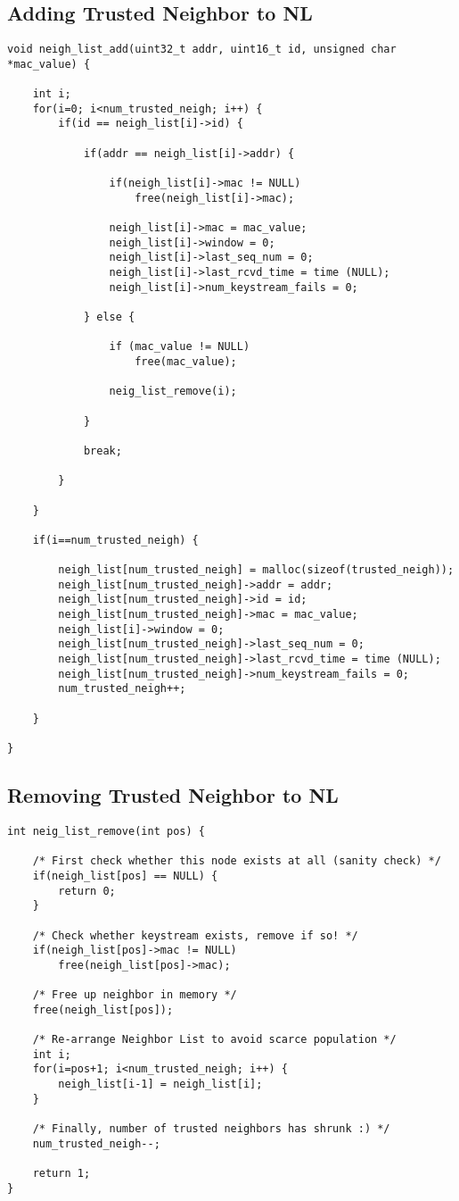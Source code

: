 \subsection{Adding Trusted Neighbor to NL}\label{code:add_to_nl}
\begin{lstlisting}[frame=tb]
void neigh_list_add(uint32_t addr, uint16_t id, unsigned char *mac_value) {

	int i;
	for(i=0; i<num_trusted_neigh; i++) {
		if(id == neigh_list[i]->id) {

			if(addr == neigh_list[i]->addr) {

				if(neigh_list[i]->mac != NULL)
					free(neigh_list[i]->mac);

				neigh_list[i]->mac = mac_value;
				neigh_list[i]->window = 0;
				neigh_list[i]->last_seq_num = 0;
				neigh_list[i]->last_rcvd_time = time (NULL);
				neigh_list[i]->num_keystream_fails = 0;

			} else {

				if (mac_value != NULL)
					free(mac_value);

				neig_list_remove(i);
				
			}
			
			break;
			
		}
		
	}

	if(i==num_trusted_neigh) {

		neigh_list[num_trusted_neigh] = malloc(sizeof(trusted_neigh));
		neigh_list[num_trusted_neigh]->addr = addr;
		neigh_list[num_trusted_neigh]->id = id;
		neigh_list[num_trusted_neigh]->mac = mac_value;
		neigh_list[i]->window = 0;
		neigh_list[num_trusted_neigh]->last_seq_num = 0;
		neigh_list[num_trusted_neigh]->last_rcvd_time = time (NULL);
		neigh_list[num_trusted_neigh]->num_keystream_fails = 0;
		num_trusted_neigh++;

	}

}

\end{lstlisting}

\subsection{Removing Trusted Neighbor to NL}\label{code:rem_from_nl}
\begin{lstlisting}[frame=tb]
int neig_list_remove(int pos) {

	/* First check whether this node exists at all (sanity check) */
	if(neigh_list[pos] == NULL) {
		return 0;
	}

	/* Check whether keystream exists, remove if so! */
	if(neigh_list[pos]->mac != NULL)
		free(neigh_list[pos]->mac);

	/* Free up neighbor in memory */
	free(neigh_list[pos]);

	/* Re-arrange Neighbor List to avoid scarce population */
	int i;
	for(i=pos+1; i<num_trusted_neigh; i++) {
		neigh_list[i-1] = neigh_list[i];
	}

	/* Finally, number of trusted neighbors has shrunk :) */
	num_trusted_neigh--;

	return 1;
}
\end{lstlisting}


